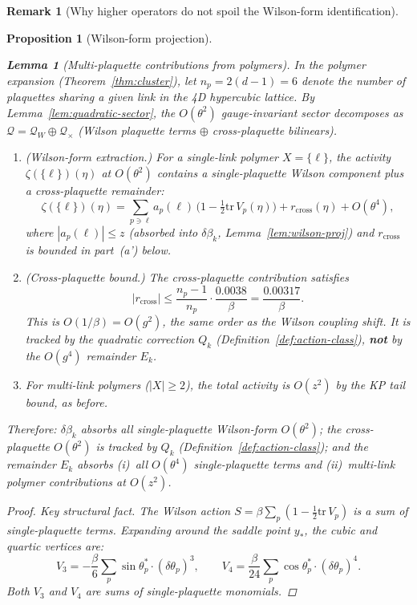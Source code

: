 \documentclass[11pt]{article}
\newtheorem{lemma}[theorem]{Lemma}
\newtheorem{proposition}[theorem]{Proposition}
\theoremstyle{definition}
\newtheorem{remark}[theorem]{Remark}
\newcommand{\tr}{\mathrm{tr}}
\begin{document}
\begin{remark}[Why higher operators do not spoil the Wilson-form identification]
\begin{proposition}[Wilson-form projection]
\begin{enumerate}[nosep,label=(\roman*)]
\begin{lemma}[Multi-plaquette contributions from
polymers]\label{lem:multi-plaq}
In the polymer expansion (Theorem~\ref{thm:cluster}),
let $n_p=2(d{-}1)=6$ denote the number of plaquettes sharing
a given link in the 4D hypercubic lattice.
By Lemma~\ref{lem:quadratic-sector}, the $O(\theta^2)$
gauge-invariant sector decomposes as
$\mathcal{Q}=\mathcal{Q}_W\oplus\mathcal{Q}_\times$
(Wilson plaquette terms $\oplus$ cross-plaquette bilinears).
\begin{enumerate}[nosep,label=(\alph*)]
\item \emph{(Wilson-form extraction.)}
For a single-link polymer $X=\{\ell\}$, the activity
$\zeta(\{\ell\})(\eta)$ at $O(\theta^2)$ contains a
\emph{single-plaquette} Wilson component plus a cross-plaquette
remainder:
\begin{equation}\label{eq:single-link-decomp}
\zeta(\{\ell\})(\eta)
=\sum_{p\ni\ell}a_p(\ell)\,
\bigl(1-\tfrac{1}{2}\tr\,V_p(\eta)\bigr)
+r_{\mathrm{cross}}(\eta)
+O(\theta^4),
\end{equation}
where $|a_p(\ell)|\le z$ (absorbed into $\delta\beta_k$,
Lemma~\ref{lem:wilson-proj}) and $r_{\mathrm{cross}}$
is bounded in part~(a') below.
\item[(a')] \emph{(Cross-plaquette bound.)}
The cross-plaquette contribution satisfies
\begin{equation}\label{eq:cross-bound}
|r_{\mathrm{cross}}|\le\frac{n_p{-}1}{n_p}
\cdot\frac{0.0038}{\beta}
=\frac{0.00317}{\beta}.
\end{equation}
This is $O(1/\beta)=O(g^2)$, the same order as the Wilson
coupling shift.  It is tracked by the quadratic
correction $Q_k$ (Definition~\ref{def:action-class}),
\textbf{not} by the $O(g^4)$ remainder $E_k$.
\item[(b)] For multi-link polymers ($|X|\ge 2$), the total activity
is $O(z^2)$ by the KP tail bound, as before.
\end{enumerate}
Therefore: $\delta\beta_k$ absorbs all single-plaquette Wilson-form
$O(\theta^2)$; the cross-plaquette $O(\theta^2)$ is tracked by
$Q_k$ (Definition~\ref{def:action-class}); and the remainder $E_k$
absorbs (i)~all $O(\theta^4)$ single-plaquette terms and
(ii)~multi-link polymer contributions at $O(z^2)$.
\end{lemma}

\begin{proof}
\emph{Key structural fact.}  The Wilson action
$S=\beta\sum_p(1-\frac{1}{2}\tr\,V_p)$ is a sum of
\emph{single-plaquette} terms.  Expanding around the
saddle point $y_*$, the cubic and quartic vertices are:
\begin{equation}
V_3=-\frac{\beta}{6}\sum_p\sin\theta_p^*\cdot(\delta\theta_p)^3,
\qquad
V_4=\frac{\beta}{24}\sum_p\cos\theta_p^*\cdot(\delta\theta_p)^4.
\end{equation}
Both $V_3$ and $V_4$ are sums of single-plaquette monomials.


\end{proof}
\end{enumerate}
\end{proposition}
\end{remark}
\end{document}
